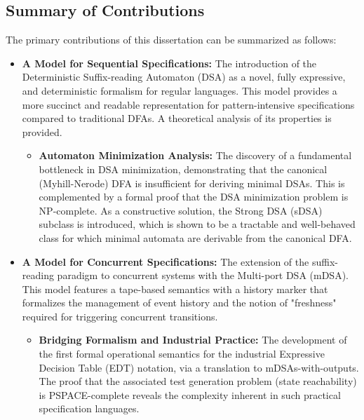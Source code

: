 \subsection*{Summary of Contributions}
The primary contributions of this dissertation can be summarized as follows:
\begin{itemize}
    \item \textbf{A Model for Sequential Specifications:} The introduction of the Deterministic Suffix-reading Automaton (DSA) as a novel, fully expressive, and deterministic formalism for regular languages. This model provides a more succinct and readable representation for pattern-intensive specifications compared to traditional DFAs. A theoretical analysis of its properties is provided.
    \begin{itemize}
    	\item \textbf{Automaton Minimization Analysis:} The discovery of a fundamental bottleneck in DSA minimization, demonstrating that the canonical (Myhill-Nerode) DFA is insufficient for deriving minimal DSAs. This is complemented by a formal proof that the DSA minimization problem is NP-complete. As a constructive solution, the Strong DSA (sDSA) subclass is introduced, which is shown to be a tractable and well-behaved class for which minimal automata are derivable from the canonical DFA.
    \end{itemize}
    
    \item \textbf{A Model for Concurrent Specifications:} The extension of the suffix-reading paradigm to concurrent systems with the Multi-port DSA (mDSA). This model features a tape-based semantics with a history marker that formalizes the management of event history and the notion of "freshness" required for triggering concurrent transitions.
    \begin{itemize}
    	\item \textbf{Bridging Formalism and Industrial Practice:} The development of the first formal operational semantics for the industrial Expressive Decision Table (EDT) notation, via a translation to mDSAs-with-outputs. The proof that the associated test generation problem (state reachability) is PSPACE-complete reveals the complexity inherent in such practical specification languages.
    \end{itemize}
\end{itemize}


